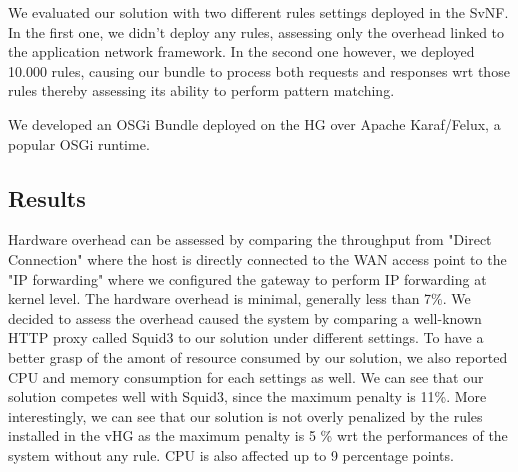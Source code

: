We evaluated our solution with two different rules settings deployed in the SvNF. In the first one, we didn't deploy any rules, assessing only the overhead linked to the application network framework. In the second one however, we deployed 10.000 rules, causing our bundle to process both requests and responses wrt those rules thereby assessing its ability to perform pattern matching.

We developed an OSGi Bundle deployed on the HG over Apache Karaf/Felux, a popular OSGi runtime.

\subsection{Results}

Hardware overhead can be assessed by comparing the throughput from "Direct Connection" where the host is directly connected to the WAN access point to the "IP forwarding" where we configured the gateway to perform IP forwarding at kernel level. The hardware overhead is minimal, generally less than 7\%.
We decided to assess the overhead caused the system by comparing a well-known HTTP proxy called Squid3 to our solution under different settings. To have a better grasp of the amont of resource consumed by our solution, we also reported CPU and memory consumption for each settings as well.
We can see that our solution competes well with Squid3, since the maximum penalty is 11\%. More interestingly, we can see that our solution is not overly penalized by the rules installed in the vHG as the maximum penalty is 5 \% wrt the performances of the system without any rule. CPU is also affected up to 9 percentage points.





